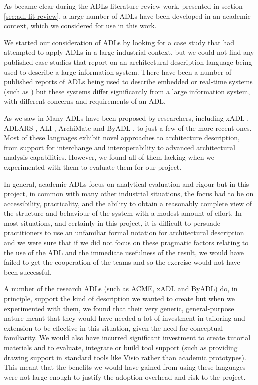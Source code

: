 As became clear during the ADLs literature review work, presented in section \ref{sec:adl-lit-review}, a large number of ADLs have been developed in an academic context, which we considered for use in this work.

We started our consideration of ADLs by looking for a case study that had attempted to apply ADLs in a large industrial context, but we could not find any published case studies that report on an architectural description language being used to describe a large information system. There have been a number of published reports of ADLs being used to describe embedded or real-time systems (such as \cite{feiler2000-realtime, lonn2004-east, cuenot2010-east, vanommering2000-koala, sae2009-aadl}) but these systems differ significantly from a large information system, with different concerns and requirements of an ADL.

As we saw in  Many ADLs have been proposed by researchers, including xADL \cite{khare2001-xadl}, ADLARS \cite{bashroush2005-adlars}, ALI \cite{bashroush2008-ali}, ArchiMate \cite{lankhorst2009-archimate} and ByADL \cite{diruscio2010-byadl}, to just a few of the more recent ones. Most of these languages exhibit novel approaches to architecture description, from support for interchange and interoperability to advanced architectural analysis capabilities.  However, we found all of them lacking when we experimented with them to evaluate them for our project.

In general, academic ADLs focus on analytical evaluation and rigour but in this project, in common with many other industrial situations, the focus had to be on accessibility, practicality, and the ability to obtain a reasonably complete view of the structure and behaviour of the system with a modest amount of effort. In most situations, and certainly in this project, it is difficult to persuade practitioners to use an unfamiliar formal notation for architectural description and we were sure that if we did not focus on these pragmatic factors relating to the use of the ADL and the immediate usefulness of the result, we would have failed to get the cooperation of the teams and so the exercise would not have been successful.

A number of the research ADLs (such as ACME, xADL and ByADL) do, in principle, support the kind of description we wanted to create but when we experimented with them, we found that their very generic, general-purpose nature meant that they would have needed a lot of investment in tailoring and extension to be effective in this situation, given the need for conceptual familiarity.  We would also have incurred significant investment to create tutorial materials and to evaluate, integrate or build tool support (such as providing drawing support in standard tools like Visio rather than academic prototypes). This meant that the benefits we would have gained from using these languages were not large enough to justify the adoption overhead and risk to the project.

